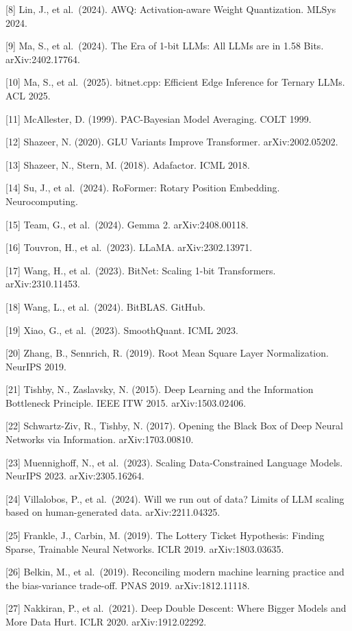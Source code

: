 {[}8{]} Lin, J., et al.~(2024). AWQ: Activation-aware Weight
Quantization. MLSys 2024.

{[}9{]} Ma, S., et al.~(2024). The Era of 1-bit LLMs: All LLMs are in
1.58 Bits. arXiv:2402.17764.

{[}10{]} Ma, S., et al.~(2025). bitnet.cpp: Efficient Edge Inference for
Ternary LLMs. ACL 2025.

{[}11{]} McAllester, D. (1999). PAC-Bayesian Model Averaging. COLT 1999.

{[}12{]} Shazeer, N. (2020). GLU Variants Improve Transformer.
arXiv:2002.05202.

{[}13{]} Shazeer, N., Stern, M. (2018). Adafactor. ICML 2018.

{[}14{]} Su, J., et al.~(2024). RoFormer: Rotary Position Embedding.
Neurocomputing.

{[}15{]} Team, G., et al.~(2024). Gemma 2. arXiv:2408.00118.

{[}16{]} Touvron, H., et al.~(2023). LLaMA. arXiv:2302.13971.

{[}17{]} Wang, H., et al.~(2023). BitNet: Scaling 1-bit Transformers.
arXiv:2310.11453.

{[}18{]} Wang, L., et al.~(2024). BitBLAS. GitHub.

{[}19{]} Xiao, G., et al.~(2023). SmoothQuant. ICML 2023.

{[}20{]} Zhang, B., Sennrich, R. (2019). Root Mean Square Layer
Normalization. NeurIPS 2019.

{[}21{]} Tishby, N., Zaslavsky, N. (2015). Deep Learning and the
Information Bottleneck Principle. IEEE ITW 2015. arXiv:1503.02406.

{[}22{]} Schwartz-Ziv, R., Tishby, N. (2017). Opening the Black Box of
Deep Neural Networks via Information. arXiv:1703.00810.

{[}23{]} Muennighoff, N., et al.~(2023). Scaling Data-Constrained
Language Models. NeurIPS 2023. arXiv:2305.16264.

{[}24{]} Villalobos, P., et al.~(2024). Will we run out of data? Limits
of LLM scaling based on human-generated data. arXiv:2211.04325.

{[}25{]} Frankle, J., Carbin, M. (2019). The Lottery Ticket Hypothesis:
Finding Sparse, Trainable Neural Networks. ICLR 2019. arXiv:1803.03635.

{[}26{]} Belkin, M., et al.~(2019). Reconciling modern machine learning
practice and the bias-variance trade-off. PNAS 2019. arXiv:1812.11118.

{[}27{]} Nakkiran, P., et al.~(2021). Deep Double Descent: Where Bigger
Models and More Data Hurt. ICLR 2020. arXiv:1912.02292.


